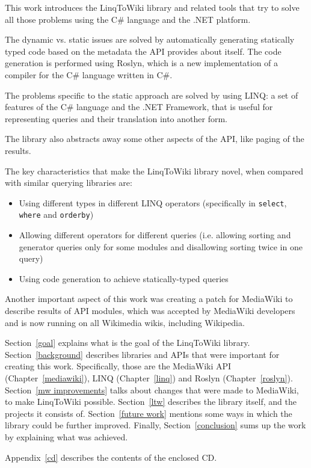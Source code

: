 \medskip

This work introduces the LinqToWiki library and related tools that try to solve all those problems
using the C\# language and the .NET platform.

The dynamic vs. static issues are solved by automatically generating statically typed
code based on the metadata the API provides about itself.
The code generation is performed using Roslyn,
which is a new implementation of a compiler for the C\# language written in C\#.

The problems specific to the static approach are solved by using \ac{LINQ}:
a set of features of the C\# language and the .NET Framework,
that is useful for representing queries and their translation into another form.

The library also abstracts away some other aspects of the \ac{API}, like paging of the results.


The key characteristics that make the LinqToWiki library novel, when compared with similar querying libraries are:

\begin{itemize}
\item Using different types in different LINQ operators
(specifically in \lstinline{select}, \lstinline{where} and \lstinline{orderby})
\item Allowing different operators for different queries
(i.e. allowing sorting and generator queries only for some modules and disallowing sorting twice in one query)
\item Using code generation to achieve statically-typed queries
\end{itemize}

Another important aspect of this work was creating a patch for MediaWiki to describe results of \ac{API} modules,
which was accepted by MediaWiki developers and is now running on all Wikimedia wikis, including Wikipedia.

Section~\ref{goal} explains what is the goal of the LinqToWiki library.
Section~\ref{background} describes libraries and \acp{API}
that were important for creating this work.
Specifically, those are the MediaWiki API (Chapter~\ref{mediawiki}),
LINQ (Chapter~\ref{linq}) and Roslyn (Chapter~\ref{roslyn}).
Section~\ref{mw improvements} talks about changes that were made to MediaWiki,
to make LinqToWiki possible.
Section~\ref{ltw} describes the library itself, and the projects it consists of.
Section~\ref{future work} mentions some ways in which the library could be further improved.
Finally, Section~\ref{conclusion} sums up the work by explaining what was achieved.

\medskip

Appendix~\ref{cd} describes the contents of the enclosed CD.